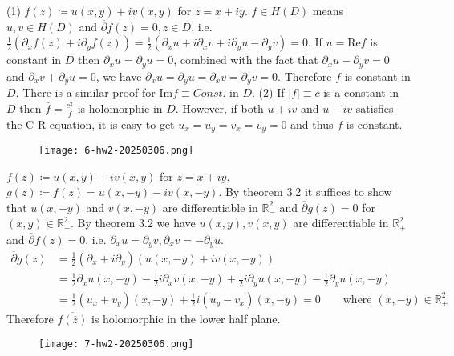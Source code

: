 (1) $f (z)\coloneqq u(x,y)+i v(x,y)$ for $z=x+iy$. $f\in H(D)$ means $u, v\in H(D)$ and $\overline{\partial}f (z)=0, z\in D$, i.e. $\frac{1}{2}(\partial _{x}f(z)+i\partial_{y}f(z))=\frac{1}{2}(\partial_{x}u+i\partial_{x}v+i\partial_{y}u-\partial_{y}v)=0$. If $u=\mathrm{Re}f$ is constant in $D$ then $\partial_{x}u=\partial_{y}u=0$, combined with the fact that $\partial_{x}u-\partial_{y}v=0$ and $\partial_{x}v+\partial_{y}u=0$, we have $\partial_{x}u=\partial_{y}u=\partial_{x}v=\partial_{y}v=0$. Therefore $f$ is constant in $D$. There is a similar proof for $\mathrm{Im}f\equiv Const.$ in $D$.
(2) If $\lvert f \rvert\equiv c$  is a constant in $D$ then $\bar{f}=\frac{c^{2}}{f}$ is holomorphic in $D$. However, if both $u+i v$ and $u-i v$ satisfies the C-R equation, it is easy to get $u_{x}=u_{y}=v_{x}=v_{y}=0$ and thus $f$ is constant.

\begin{figure}[H]
\centering
\texttt{[image: 6-hw2-20250306.png]}
\label{}
\end{figure}

$f(z)\coloneqq u(x,y)+iv(x,y)$ for $z=x+i y$. $g(z)\coloneqq\overline{f (\overline{z})}=u (x,-y)-i v(x,-y)$. By theorem 3.2 it suffices to show that $u(x,-y)$ and $v(x,-y)$ are differentiable in $\mathbb{R}^{2}_{-}$ and $\overline{\partial}g(z)=0$ for $(x,y)\in \mathbb{R}^{2}_{-}$. By theorem 3.2 we have $u(x,y),v(x,y)$ are differentiable in $\mathbb{R}^{2}_{+}$ and $\overline{\partial}f(z)=0$, i.e. $\partial_{x}u=\partial_{y}v,\partial_{x}v=-\partial_{y}u$.
\[
\begin{aligned}
\overline{\partial }g(z) & =\frac{1}{2}(\partial _{x}+i\partial _{y})(u(x,-y)+i v(x,-y)) \\
 & =\frac{1}{2}\partial _{x}u(x,-y)-\frac{1}{2}i\partial _{x}v(x,-y)+\frac{1}{2}i\partial _{y}u(x,-y)-\frac{1}{2} \partial _{y}u(x,-y) \\
 & =\frac{1}{2}(u_{x}+v_{y})(x,-y)+\frac{1}{2}i(u_{y}-v_{x})(x,-y)=0\qquad \text{where }(x,-y)\in \mathbb{R}^{2}_{+}
\end{aligned}
\]
Therefore $\overline{f(\overline{z})}$ is holomorphic in the lower half plane.

\begin{figure}[H]
\centering
\texttt{[image: 7-hw2-20250306.png]}
\label{}
\end{figure}

